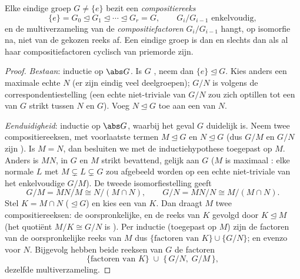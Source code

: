 \begin{theorem}\label{thm:b3:groups:jordanholder}
Elke eindige groep $G \neq \{e\}$ bezit een
\emph{compositiereeks}
\[
\{e\} = G_0 \trianglelefteq G_1 \trianglelefteq \cdots
\trianglelefteq G_r = G,
\qquad G_{i}/G_{i-1} \text{ enkelvoudig},
\]
en de multiverzameling van de \emph{compositiefactoren}
$G_i/G_{i-1}$ hangt, op isomorfie na, niet van de gekozen reeks af.
Een eindige groep is  dan en slechts dan als al haar
compositiefactoren cyclisch van priemorde zijn.
\end{theorem}

\begin{proof}
\emph{Bestaan}: inductie op $\abs G$. Is $G$ , neem dan
$\{e\} \trianglelefteq G$. Kies anders een maximale echte
 $N$ (er zijn eindig veel deelgroepen); $G/N$ is
 volgens de correspondentiestelling (een echte
niet-triviale  van $G/N$ zou zich optillen tot een
 van $G$ strikt tussen $N$ en $G$). Voeg $N
\trianglelefteq G$ toe aan een  van $N$.

\emph{Eenduidigheid}: inductie op $\abs G$, waarbij het geval $G$
 duidelijk is. Neem twee compositiereeksen, met
voorlaatste termen $M \trianglelefteq G$ en $N \trianglelefteq G$
(dus $G/M$ en $G/N$ zijn ). Is $M = N$, dan besluiten we
met de inductiehypothese toegepast op $M$. Anders is $MN$, 
in $G$ en $M$ strikt bevattend, gelijk aan $G$ ($M$ is maximaal
: elke normale $L$ met $M \subsetneq L \subsetneq G$ zou
afgebeeld worden op een echte niet-triviale  van het
enkelvoudige $G/M$). De tweede isomorfiestelling geeft
\[
G/M = MN/M \cong N/(M \cap N),
\qquad
G/N = MN/N \cong M/(M \cap N).
\]
Stel $K = M \cap N$ ($\trianglelefteq G$) en kies een
 van $K$. Dan draagt $M$ twee compositiereeksen: de
oorspronkelijke, en de reeks van $K$ gevolgd door $K
\trianglelefteq M$ (het quotiënt $M/K \cong G/N$ is ).
Per inductie (toegepast op $M$) zijn de factoren van de
oorspronkelijke reeks van $M$ dus $\{\text{factoren van } K\} \cup
\{G/N\}$; en evenzo voor $N$. Bijgevolg hebben beide reeksen van
$G$ de factoren
\[
\{\text{factoren van } K\} \;\cup\; \{\,G/N,\; G/M\,\},
\]
dezelfde multiverzameling.


\end{proof}
